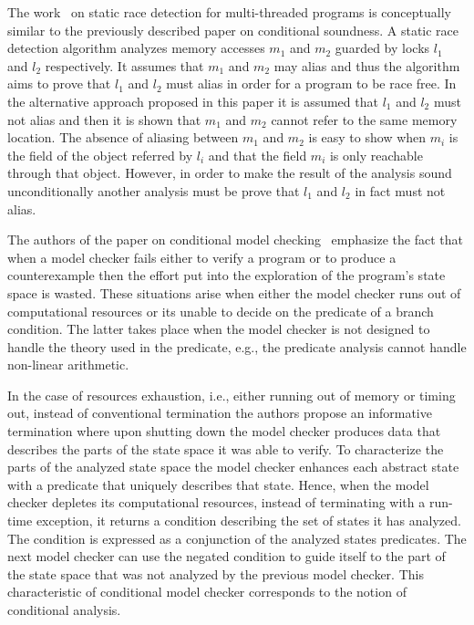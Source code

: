 The work~\cite{Naik:POPL07} on static race detection for multi-threaded programs is conceptually similar to the previously described paper on conditional soundness. A static race detection algorithm analyzes memory accesses $m_1$ and $m_2$ guarded by locks $l_1$ and $l_2$ respectively. It assumes that $m_1$ and $m_2$ may alias and thus the algorithm aims to prove that $l_1$ and $l_2$ must alias in order for a program to be race free. In the alternative approach proposed in this paper it is assumed that $l_1$ and $l_2$ must not alias and then it is shown that $m_1$ and $m_2$ cannot refer to the same memory location. The absence of aliasing between $m_1$ and $m_2$ is easy to show when $m_i$ is the field of the object referred by $l_i$ and that the field $m_i$ is only reachable through that object. However, in order to make the result of the analysis sound unconditionally another analysis must be prove that $l_1$ and $l_2$ in fact must not alias.

The authors of the paper on conditional model checking~\cite{Beyer:Tech11} emphasize the fact that when a model checker fails either to verify a program or to produce a counterexample then the effort put into the exploration of the program's state space is wasted. These situations arise when either the model checker runs out of computational resources or its unable to decide on the predicate of a branch condition. The latter takes place when the model checker is not designed to handle the theory used in the predicate, e.g., the predicate analysis cannot handle non-linear arithmetic.

In the case of resources exhaustion, i.e., either running out of memory or timing out,  instead of conventional termination the authors propose an informative termination where upon shutting down the model checker produces data that describes the parts of the state space it was able to verify. To characterize the parts of the analyzed state space the model checker enhances each abstract state with a predicate that uniquely describes that state. Hence, when the model checker depletes its computational resources, instead of terminating with a run-time exception, it returns a condition describing the set of states it has analyzed. The condition is expressed as a conjunction of the analyzed states predicates. The next model checker can use the negated condition to guide itself to the part of the state space that was not analyzed by the previous model checker. This characteristic of conditional model checker corresponds to the notion of conditional analysis.

